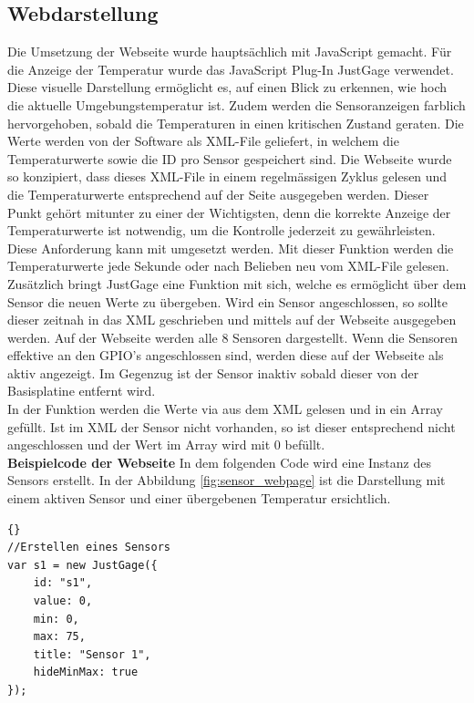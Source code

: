 \subsection{Webdarstellung}
Die Umsetzung der Webseite wurde hauptsächlich mit JavaScript gemacht.
Für die Anzeige der Temperatur wurde das JavaScript Plug-In JustGage verwendet. Diese visuelle Darstellung ermöglicht es, auf einen Blick zu erkennen, wie hoch die aktuelle Umgebungstemperatur ist. Zudem werden die Sensoranzeigen farblich hervorgehoben, sobald die Temperaturen in einen kritischen Zustand geraten. 
Die Werte werden von der Software als XML-File geliefert, in welchem die Temperaturwerte sowie die ID pro Sensor gespeichert sind. Die Webseite wurde so konzipiert, dass dieses XML-File in einem regelmässigen Zyklus gelesen und die Temperaturwerte entsprechend auf der Seite ausgegeben werden. Dieser Punkt gehört mitunter zu einer der Wichtigsten, denn die korrekte Anzeige der Temperaturwerte ist notwendig, um die Kontrolle jederzeit zu gewährleisten. Diese Anforderung kann mit  umgesetzt werden. Mit dieser Funktion werden die Temperaturwerte jede Sekunde oder nach Belieben neu vom XML-File gelesen.
Zusätzlich bringt JustGage eine Funktion mit sich, welche es ermöglicht über  dem Sensor die neuen Werte zu übergeben. Wird ein Sensor angeschlossen, so sollte dieser zeitnah in das XML geschrieben und mittels  auf der Webseite ausgegeben werden. Auf der Webseite werden alle 8 Sensoren dargestellt. Wenn die Sensoren effektive an den GPIO's angeschlossen sind,  werden diese auf der Webseite als \grqq{}aktiv\glqq{} angezeigt. Im Gegenzug ist der Sensor \grqq{}inaktiv\glqq{} sobald dieser von der Basisplatine entfernt wird.\\
In der Funktion  werden die Werte via  aus dem XML gelesen und in ein Array gefüllt. Ist im XML der Sensor nicht vorhanden, so ist dieser entsprechend nicht angeschlossen und der Wert im Array wird mit 0 befüllt.\\

\textbf{Beispielcode der Webseite}\newline 
In dem folgenden Code wird eine Instanz des Sensors erstellt. In der Abbildung \ref{fig:sensor_webpage} ist die Darstellung mit einem aktiven Sensor und einer übergebenen Temperatur ersichtlich. 
\begin{lstlisting}{}
//Erstellen eines Sensors
var s1 = new JustGage({
	id: "s1",
	value: 0,
	min: 0,
	max: 75,
	title: "Sensor 1",
	hideMinMax: true
});
\end{lstlisting}


